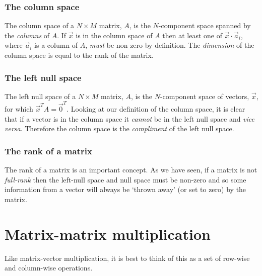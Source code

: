 \documentclass[a4paper]{article}
\newcommand{\highlight}[1]{{\color{blue}#1}}
\begin{document}
\subsubsection{The column space}

The column space of a $N \times M$ matrix, $A$, is \highlight{the $N$-component
space spanned by the \emph{columns} of $A$}. If $\vec{x}$ is in the column
space of $A$ then at least one of $\vec{x} \cdot \vec{a}_i$, where $\vec{a}_i$
is a column of $A$, \emph{must} be non-zero by definition. \highlight{The
\emph{dimension} of the column space is equal to the rank of the matrix.}

\subsubsection{The left null space}

The left null space of a $N \times M$ matrix, $A$, is the \highlight{$N$-component}
space of vectors, $\vec{x}$, for which \highlight{$\vec{x}^TA = \vec{0}^T$}. Looking
at our definition of the column space, it is clear that if a vector is in the
column space it \emph{cannot} be in the left null space and \emph{vice versa}.
Therefore the column space is the \emph{compliment} of the left null space.

\subsubsection{The rank of a matrix}

The rank of a matrix is an important concept. As we have seen, if a matrix is
not \emph{full-rank} then the left-null space and null space must be non-zero
and so some information from a vector will always be `thrown away' (or set to
zero) by the matrix.

\section{Matrix-matrix multiplication}

Like matrix-vector multiplication, it is best to think of this as a set of
row-wise and column-wise operations.
\end{document}
